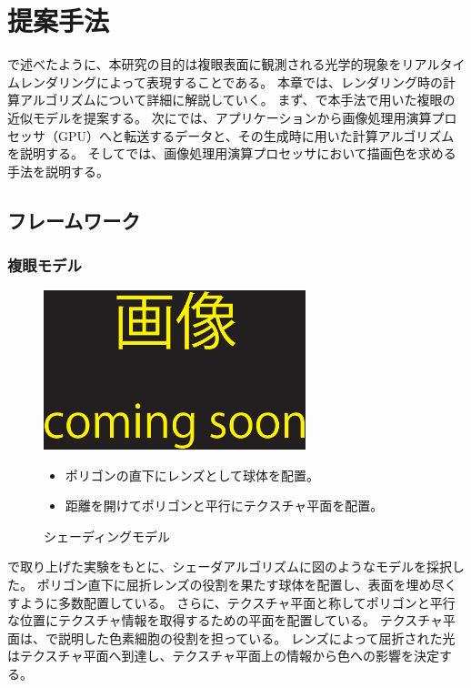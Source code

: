 \chapter{提案手法}
\label{CMethod}

で述べたように、本研究の目的は複眼表面に観測される光学的現象をリアルタイムレンダリングによって表現することである。
本章では、レンダリング時の計算アルゴリズムについて詳細に解説していく。
まず、で本手法で用いた複眼の近似モデルを提案する。
次にでは、アプリケーションから画像処理用演算プロセッサ（GPU）へと転送するデータと、その生成時に用いた計算アルゴリズムを説明する。
そしてでは、画像処理用演算プロセッサにおいて描画色を求める手法を説明する。

\section{フレームワーク}
\label{SFramework}

\subsection{複眼モデル}
\label{SSModel}

\begin{figure}[h]
  \centering
  \includegraphics[width=3.0in]{./img/TEMP}
  \caption{シェーディングモデル}{\begin{itemize}\item ポリゴンの直下にレンズとして球体を配置。\item 距離を開けてポリゴンと平行にテクスチャ平面を配置。\end{itemize}}
  \label{FModel}
\end{figure}

で取り上げた実験をもとに、シェーダアルゴリズムに図のようなモデルを採択した。
ポリゴン直下に屈折レンズの役割を果たす球体を配置し、表面を埋め尽くすように多数配置している。
さらに、テクスチャ平面と称してポリゴンと平行な位置にテクスチャ情報を取得するための平面を配置している。
テクスチャ平面は、\secref{}で説明した色素細胞の役割を担っている。
レンズによって屈折された光はテクスチャ平面へ到達し、テクスチャ平面上の情報から色への影響を決定する。

